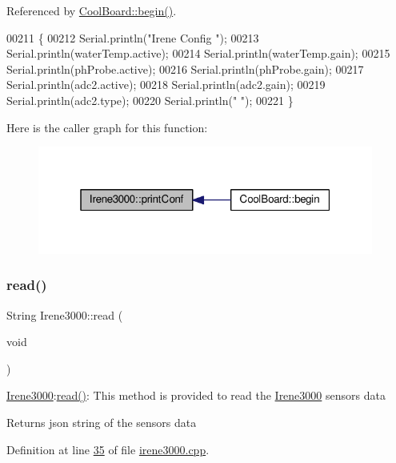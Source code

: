 Referenced by \hyperlink{_cool_board_8cpp_source_l00021}{Cool\+Board\+::begin()}.


\begin{DoxyCode}
00211 \{
00212     Serial.println(\textcolor{stringliteral}{"Irene Config "});
00213     Serial.println(waterTemp.active);
00214     Serial.println(waterTemp.gain); 
00215     Serial.println(phProbe.active);
00216     Serial.println(phProbe.gain);
00217     Serial.println(adc2.active);
00218     Serial.println(adc2.gain);
00219     Serial.println(adc2.type);
00220     Serial.println(\textcolor{stringliteral}{" "});
00221 \}
\end{DoxyCode}
Here is the caller graph for this function\+:\nopagebreak
\begin{figure}[H]
\begin{center}
\leavevmode
\includegraphics[width=313pt]{class_irene3000_a7bc2414100b5e19eacc6630fa34b2654_icgraph}
\end{center}
\end{figure}
\mbox{\label{class_irene3000_a852a170feea994ea1df01c6b245b5d9a}} 
\subsubsection{\texorpdfstring{read()}{read()}}
{\footnotesize\ttfamily String Irene3000\+::read (\begin{DoxyParamCaption}\item[{void}]{ }\end{DoxyParamCaption})}

\hyperlink{class_irene3000}{Irene3000}\+:\hyperlink{class_irene3000_a852a170feea994ea1df01c6b245b5d9a}{read()}\+: This method is provided to read the \hyperlink{class_irene3000}{Irene3000} sensors data

\begin{DoxyReturn}{Returns}
json string of the sensors data 
\end{DoxyReturn}


Definition at line \hyperlink{irene3000_8cpp_source_l00035}{35} of file \hyperlink{irene3000_8cpp_source}{irene3000.\+cpp}.



